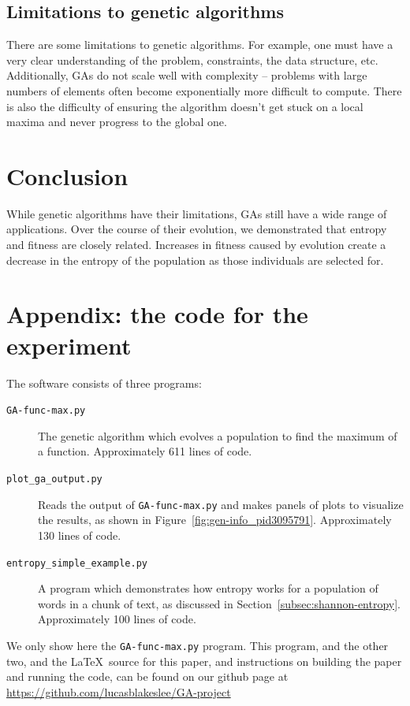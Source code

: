 \documentclass[11pt]{article}
\begin{document}
\subsection{Limitations to genetic algorithms}
\label{sec:org148bf83}

There are some limitations to genetic algorithms. For example, one
must have a very clear understanding of the problem, constraints, the
data structure, etc. Additionally, GAs do not scale
well with complexity -- problems with large numbers of elements often
become exponentially more difficult to compute. There is also the
difficulty of ensuring the algorithm doesn't get stuck on a local
maxima and never progress to the global one.

\section{Conclusion}
While genetic algorithms have their limitations, GAs still have a wide range 
of applications. Over the course of their evolution, we demonstrated 
that entropy and fitness are closely related. Increases in fitness 
caused by evolution create a decrease in the entropy of the population 
as those individuals are selected for.

\appendix
\section*{Appendix: the code for the experiment}

The software consists of three programs:
\begin{description}
\item [\texttt{GA-func-max.py}] The genetic algorithm which evolves a
  population to find the maximum of a function.  Approximately 611
  lines of code.
\item [\texttt{plot\_ga\_output.py}] Reads the output of
  \texttt{GA-func-max.py} and makes panels of plots to visualize the
  results, as shown in Figure~\ref{fig:gen-info_pid3095791}.
  Approximately 130 lines of code.
\item [\texttt{entropy\_simple\_example.py}] A program which
  demonstrates how entropy works for a population of words in a chunk
  of text, as discussed in Section~\ref{subsec:shannon-entropy}.
  Approximately 100 lines of code.
\end{description}

We only show here the \texttt{GA-func-max.py} program.  This program,
and the other two, and the \LaTeX\ source for this paper, and
instructions on building the paper and running the code, can be found
on our github page at
\url{https://github.com/lucasblakeslee/GA-project}
\end{document}
